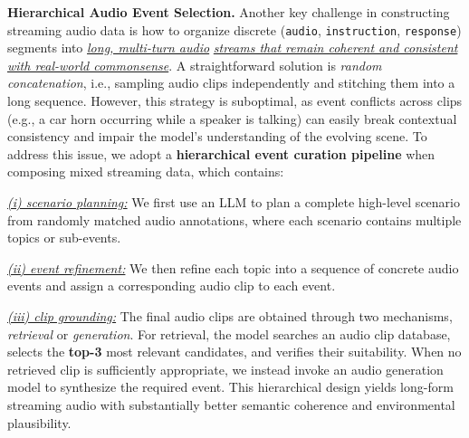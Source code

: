 \documentclass{article}
\begin{document}

\textbf{Hierarchical Audio Event Selection.} Another key challenge in constructing streaming audio data is how to organize discrete (\texttt{audio}, \texttt{instruction}, \texttt{response}) segments into \underline{\textit{long, multi-turn audio}} \underline{\textit{streams that remain coherent and consistent with real-world commonsense}}. A straightforward solution is \textit{random concatenation}, i.e., sampling audio clips independently and stitching them into a long sequence. However, this strategy is suboptimal, as event conflicts across clips (e.g., a car horn occurring while a speaker is talking) can easily break contextual consistency and impair the model's understanding of the evolving scene. To address this issue, we adopt a \textbf{hierarchical event curation pipeline} when composing mixed streaming data, which contains: 

\vspace{-1mm}
\underline{\textit{(i) scenario planning:}} We first use an LLM to plan a complete high-level scenario from randomly matched audio annotations, where each scenario contains multiple topics or sub-events. 

\vspace{-1mm}
\underline{\textit{(ii) event refinement:}} We then refine each topic into a sequence of concrete audio events and assign a corresponding audio clip to each event. 

\vspace{-1mm}
\underline{\textit{(iii) clip grounding:}} The final audio clips are obtained through two mechanisms, \textit{retrieval} or \textit{generation}. For retrieval, the model searches an audio clip database, selects the \textbf{top-3} most relevant candidates, and verifies their suitability. When no retrieved clip is sufficiently appropriate, we instead invoke an audio generation model to synthesize the required event. This hierarchical design yields long-form streaming audio with substantially better semantic coherence and environmental plausibility.


\end{document}
